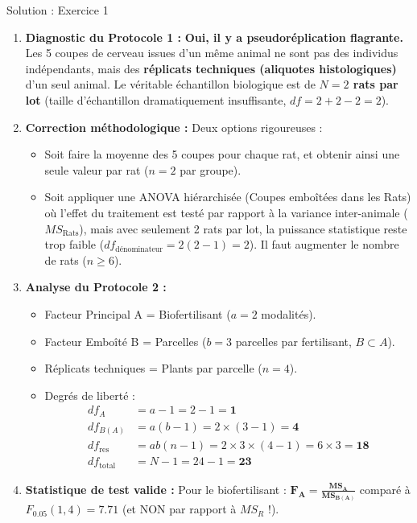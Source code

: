 \documentclass[11pt,a4paper]{article}
\begin{document}
\begin{solutionbox}{Solution : Exercice 1}
\begin{enumerate}[label=\textbf{\alph*.}]
  \item \textbf{Diagnostic du Protocole 1 :}
  \textbf{Oui, il y a pseudoréplication flagrante.} Les 5 coupes de cerveau issues d'un même animal ne sont pas des individus indépendants, mais des \textbf{réplicats techniques (aliquotes histologiques)} d'un seul animal. Le véritable échantillon biologique est de \textbf{$N = 2$ rats par lot} (taille d'échantillon dramatiquement insuffisante, $df = 2 + 2 - 2 = 2$).
  \item \textbf{Correction méthodologique :}
  Deux options rigoureuses :
  \begin{itemize}
    \item Soit faire la moyenne des 5 coupes pour chaque rat, et obtenir ainsi une seule valeur par rat ($n=2$ par groupe).
    \item Soit appliquer une ANOVA hiérarchisée (Coupes emboîtées dans les Rats) où l'effet du traitement est testé par rapport à la variance inter-animale ($MS_{\text{Rats}}$), mais avec seulement 2 rats par lot, la puissance statistique reste trop faible ($df_{\text{dénominateur}} = 2(2-1) = 2$). Il faut augmenter le nombre de rats ($n \ge 6$).
  \end{itemize}
  \item \textbf{Analyse du Protocole 2 :}
  \begin{itemize}
    \item Facteur Principal A = Biofertilisant ($a = 2$ modalités).
    \item Facteur Emboîté B = Parcelles ($b = 3$ parcelles par fertilisant, $B \subset A$).
    \item Réplicats techniques = Plants par parcelle ($n = 4$).
    \item Degrés de liberté :
    \begin{align*}
      df_A &= a - 1 = 2 - 1 = \mathbf{1} \\
      df_{B(A)} &= a(b - 1) = 2 \times (3 - 1) = \mathbf{4} \\
      df_{\text{res}} &= ab(n - 1) = 2 \times 3 \times (4 - 1) = 6 \times 3 = \mathbf{18} \\
      df_{\text{total}} &= N - 1 = 24 - 1 = \mathbf{23}
    \end{align*}
  \end{itemize}
  \item \textbf{Statistique de test valide :}
  Pour le biofertilisant : $\mathbf{F_A = \frac{MS_A}{MS_{B(A)}}}$ comparé à $F_{0.05}(1, 4) = \mathbf{7.71}$ (et NON par rapport à $MS_R$ !).
\end{enumerate}
\end{solutionbox}
\end{document}
